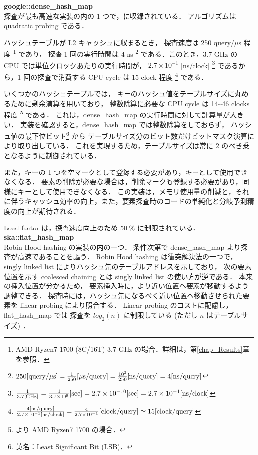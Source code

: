 {\bf google::dense\_hash\_map}
\samepage \\ \indent
探査が最も高速な実装の内の 1 つで，\cite{sparsehash2005}に収録されている．
アルゴリズムは quadratic probing である．

ハッシュテーブルが L2 キャッシュに収まるとき，
探査速度は 250 query/$\mu$s 程度 \footnote{AMD Ryzen7 1700 (8C/16T) 3.7 GHz の場合．詳細は，第\ref{chap_Results}章を参照．} であり，
探査 1 回の実行時間は 4 ns
\footnote{
  $
    250{\rm [query \slash \mu s]}
    = \frac{1}{250} {\rm [\mu s \slash query]}
    = \frac{10^3}{250} {\rm [ns \slash query]}
    = 4 {\rm [ns \slash query]}
  $
}
である．このとき，3.7 GHz の CPU では単位クロックあたりの実行時間が，
$2.7 \times 10^{-1}$ [ns/clock]
\footnote{
  $
    \frac{1}{3.7 {\rm [GHz]}}
    = \frac{1}{3.7 \times 10^9}{\rm [sec]}
    = 2.7 \times 10^{-10}{\rm [sec]}
    = 2.7 \times 10^{-1}{\rm [ns/clock]}
  $
}
であるから，1 回の探査で消費する CPU cycle は
15 clock 程度 \footnote
{
  $
    \frac{ 4 {\rm [ns/query]} }{ 2.7 \times 10^{-1} {\rm [ns/clock]} }
    = \frac{ 4 }{ 2.7 \times 10^{-1} } {\rm [clock/query]}
    \simeq 15 {\rm [clock/query]}
  $
} である．

いくつかのハッシュテーブルでは，
キーのハッシュ値をテーブルサイズに丸めるために剰余演算を用いており，
整数除算に必要な CPU cycle は 14\textasciitilde 46 clocks 程度
\footnote{
  \cite{AgnerFog2018}より AMD Ryzen7 1700 の場合．
}
である．
これは，dense\_hash\_map の実行時間に対して計算量が大きい．
実装を確認すると，dense\_hash\_map では整数除算をしておらず，
ハッシュ値の最下位ビット\footnote{英名：Least Significant Bit (LSB)．} から
テーブルサイズ分のビット数だけビットマスク演算により取り出している．
これを実現するため，テーブルサイズは常に 2 のべき乗となるように制御されている．

また，キーの 1 つを空マークとして登録する必要があり，キーとして使用できなくなる．
要素の削除が必要な場合は，削除マークも登録する必要があり，同様にキーとして使用できなくなる．
この実装は，メモリ使用量の削減と，それに伴うキャッシュ効率の向上，また，要素探査時のコードの単純化と分岐予測精度の向上が期待される．

Load factor は，探査速度向上のため 50 \% に制限されている．
\\

{\bf ska::flat\_hash\_map}
\samepage \\ \indent
Robin Hood hashing の実装の内の一つ．
条件次第で dense\_hash\_map より探査が高速であることを謳う．
Robin Hood hashing は衝突解決法の一つで，
singly linked list によりハッシュ先のテーブルアドレスを示しており，
次の要素位置を示す coalesced chaining とは singly linked list の使い方が逆である．
本来の挿入位置が分かるため，
要素挿入時に，より近い位置へ要素が移動するよう調整できる．
探査時には，ハッシュ先になるべく近い位置へ移動させられた要素を linear probing により照合する．
Linear probing のコストに配慮し，flat\_hash\_map では
探査を $log_2(n)$ に制限している (ただし $n$ はテーブルサイズ) \citep{Skarupke2017}．

